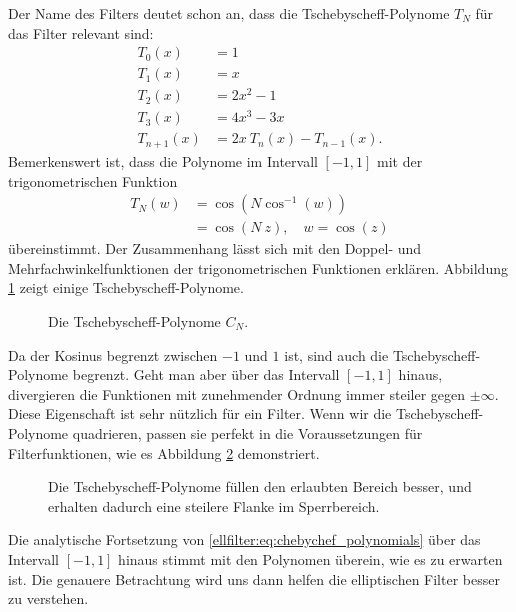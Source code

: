 \begin{refsection}
Der Name des Filters deutet schon an, dass die Tschebyscheff-Polynome $T_N$ für das Filter relevant sind:
\begin{align}
    T_{0}(x)&=1\\
    T_{1}(x)&=x\\
    T_{2}(x)&=2x^{2}-1\\
    T_{3}(x)&=4x^{3}-3x\\
    T_{n+1}(x)&=2x~T_{n}(x)-T_{n-1}(x).
\end{align}
Bemerkenswert ist, dass die Polynome im Intervall $[-1, 1]$ mit der trigonometrischen Funktion
\begin{align} \label{ellfilter:eq:chebychef_polynomials}
    T_N(w) &= \cos \left( N \cos^{-1}(w) \right) \\
           &= \cos \left(N~z \right), \quad w= \cos(z)
\end{align}
übereinstimmt.
Der Zusammenhang lässt sich mit den Doppel- und Mehrfachwinkelfunktionen der trigonometrischen Funktionen erklären.
Abbildung \ref{ellfilter:fig:chebychef_polynomials} zeigt einige Tschebyscheff-Polynome.
\begin{figure}
    \centering
    
    \caption{Die Tschebyscheff-Polynome $C_N$.}
    \label{ellfilter:fig:chebychef_polynomials}
\end{figure}
Da der Kosinus begrenzt zwischen $-1$ und $1$ ist, sind auch die Tschebyscheff-Polynome begrenzt.
Geht man aber über das Intervall $[-1, 1]$ hinaus, divergieren die Funktionen mit zunehmender Ordnung immer steiler gegen $\pm \infty$.
Diese Eigenschaft ist sehr nützlich für ein Filter.
Wenn wir die Tschebyscheff-Polynome quadrieren, passen sie perfekt in die Voraussetzungen für Filterfunktionen, wie es Abbildung \ref{ellfiter:fig:chebychef} demonstriert.
\begin{figure}
    \centering
    
    \caption{Die Tschebyscheff-Polynome füllen den erlaubten Bereich besser, und erhalten dadurch eine steilere Flanke im Sperrbereich.}
    \label{ellfiter:fig:chebychef}
\end{figure}


Die analytische Fortsetzung von \eqref{ellfilter:eq:chebychef_polynomials} über das Intervall $[-1,1]$ hinaus stimmt mit den Polynomen überein, wie es zu erwarten ist.
Die genauere Betrachtung wird uns dann helfen die elliptischen Filter besser zu verstehen.


\end{refsection}
